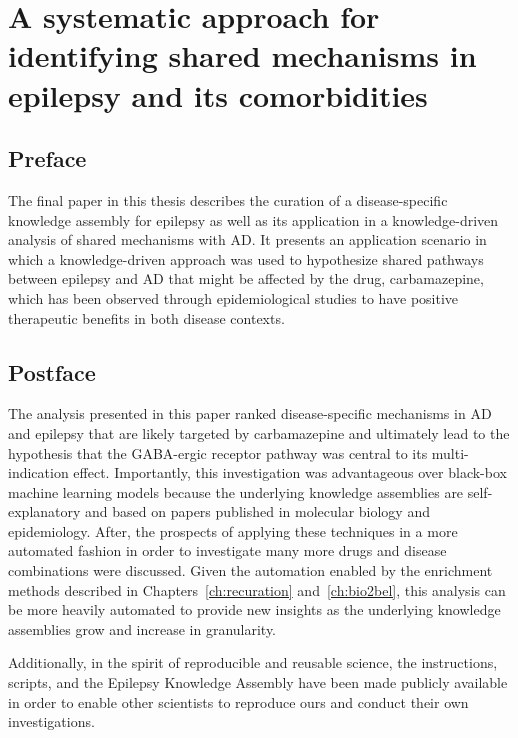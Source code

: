 \chapter{A systematic approach for identifying shared mechanisms in epilepsy and its comorbidities}
\label{ch:epicom}

\section*{Preface}

The final paper in this thesis describes the curation of a disease-specific knowledge assembly for epilepsy as well as its application in a knowledge-driven analysis of shared mechanisms with \ac{AD}.
It presents an application scenario in which a knowledge-driven approach was used to hypothesize shared pathways between epilepsy and \ac{AD} that might be affected by the drug, carbamazepine, which has been observed through epidemiological studies to have positive therapeutic benefits in both disease contexts.

\vspace*{\fill}



\section*{Postface}

The analysis presented in this paper ranked disease-specific mechanisms in \ac{AD} and epilepsy that are likely targeted by carbamazepine and ultimately lead to the hypothesis that the GABA-ergic receptor pathway was central to its multi-indication effect.
Importantly, this investigation was advantageous over black-box machine learning models because the underlying knowledge assemblies are self-explanatory and based on papers published in molecular biology and epidemiology.
After, the prospects of applying these techniques in a more automated fashion in order to investigate many more drugs and disease combinations were discussed.
Given the automation enabled by the enrichment methods described in Chapters~\ref{ch:recuration} and~\ref{ch:bio2bel}, this analysis can be more heavily automated to provide new insights as the underlying knowledge assemblies grow and increase in granularity.

Additionally, in the spirit of reproducible and reusable science, the instructions, scripts, and the Epilepsy Knowledge Assembly have been made publicly available in order to enable other scientists to reproduce ours and conduct their own investigations.

